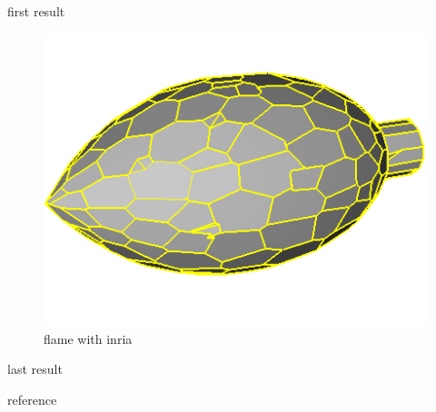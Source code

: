 \documentclass[10pt]{beamer}
\begin{document}
\begin{frame}{first result}
\begin{figure}[H]
\begin{minipage}[t]{0.33\textwidth}
        \includegraphics[width=\textwidth]{../../images/screen_kinetic/flame_inria.png}
        \caption*{flame with inria}
      \end{minipage}
\end{figure}
\end{frame}

\begin{frame}{last result}

\end{frame}




\begin{frame}[allowframebreaks]{reference}
    \nocite{*}
    
    
\end{frame}
\end{document}
